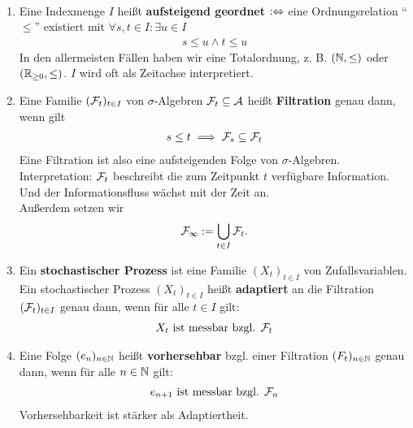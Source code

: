 \begin{defi}\
\begin{enumerate}[label=(\alph*)]
\item Eine Indexmenge $I$ heißt \textbf{aufsteigend geordnet} $:\Leftrightarrow$ eine Ordnungsrelation ``$\leq$'' existiert mit $ \forall s,t\in I:\exists u\in I$
\begin{align*}
s\leq u\wedge t\leq u
\end{align*}
In den allermeisten Fällen haben wir eine Totalordnung, z. B. $(\mathbb{N},\leq)$ oder $(\mathbb{R}_{\geq0},\leq)$. $I$ wird oft als Zeitachse interpretiert.
\item Eine Familie $(\mathcal{F}_t)_{t\in I}$ von $\sigma$-Algebren $\mathcal{F}_t\subseteq\mathcal{A}$ heißt \textbf{Filtration} genau dann, wenn gilt
\begin{align*}
s\leq t\implies\mathcal{F}_s\subseteq\mathcal{F}_t
\end{align*}
Eine Filtration ist also eine aufsteigenden Folge von $\sigma$-Algebren.\\
Interpretation: $\mathcal{F}_t$ beschreibt die zum Zeitpunkt $t$ verfügbare Information. Und der Informationsfluss wächst mit der Zeit an.\\
Außerdem setzen wir
\begin{align*}
\mathcal{F}_\infty:=\bigcup\limits_{t\in I}\mathcal{F}_t.
\end{align*}
\item Ein \textbf{stochastischer Prozess} ist eine Familie $(X_t)_{t\in I}$ von Zufallsvariablen.\\
Ein stochastischer Prozess $(X_t)_{t\in I}$ heißt \textbf{adaptiert} an die Filtration $(\mathcal{F}_t)_{t\in I}$ genau dann, wenn für alle $t\in I$ gilt:
\begin{align*}
X_t\text{ ist messbar bzgl. }\mathcal{F}_t
\end{align*}
\item Eine Folge $(e_n)_{n\in\mathbb{N}}$ heißt \textbf{vorhersehbar} bzgl. einer Filtration $(F_t)_{n\in\mathbb{N}}$ genau dann, wenn für alle $n\in \mathbb{N}$ gilt:
\begin{align*}
e_{n+1}\text{ ist messbar bzgl. }\mathcal{F}_n
\end{align*}
Vorhersehbarkeit ist stärker als Adaptiertheit.
\end{enumerate}
\end{defi}

